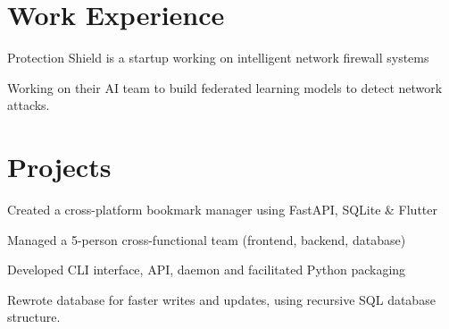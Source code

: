 \documentclass[]{resume-template}
\begin{document}
\begin{minipage}[t]{0.66\textwidth}

    \section{Work Experience}\label{sec:Work Experience}
    \label{subsec:protectionshield}
    \vspace{\topsep}
    \begin{tightemize}
        \item Protection Shield is a startup working on intelligent network firewall systems
        \item Working on their AI team to build federated learning models to detect network attacks.
    \end{tightemize}

    \section{Projects}\label{sec:projects}

    \label{subsec: Bookie}
    \begin{tightemize}
        \item Created a cross-platform bookmark manager using FastAPI, SQLite \& Flutter
        \item Managed a 5-person cross-functional team (frontend, backend, database)
        \item Developed CLI interface, API, daemon and facilitated Python packaging
        \item Rewrote database for faster writes and updates, using recursive SQL database structure. \\
    \end{tightemize}
    \vspace{\topsep}


\end{minipage}
\end{document}
